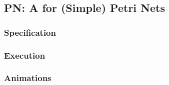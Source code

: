 \subsection{\textsf{PN}: A \DSL for (Simple) Petri Nets}
\label{sec:Examples:PN}

\subsubsection{Specification}
\label{sec:Examples:PN:Specification}

\subsubsection{Execution}
\label{sec:Examples:PN:Execution}

\subsubsection{Animations}
\label{sec:Examples:PN:Animations}
